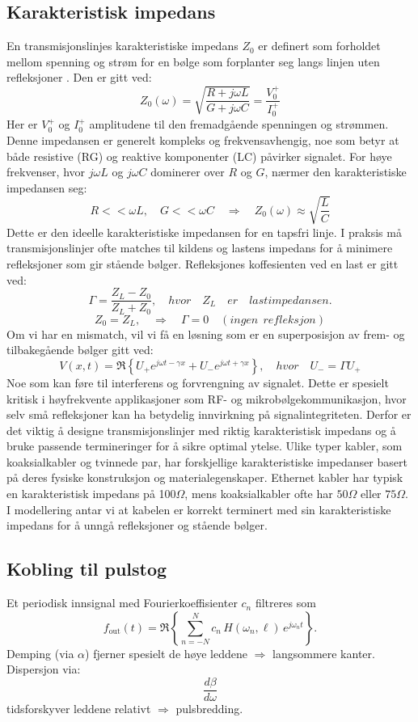 \subsection{Karakteristisk impedans}
En transmisjonslinjes karakteristiske impedans \(Z_0\) er definert som forholdet mellom spenning og strøm for en bølge som forplanter seg langs linjen uten refleksjoner \cite{HaytBuck2018}. Den er gitt ved:
\[
Z_0(\omega) = \sqrt{\frac{R + j\omega L}{G + j\omega C}} = \frac{V_0^+}{I_0^+} 
\]
Her er \(V_0^+\) og \(I_0^+\) amplitudene til den fremadgående spenningen og strømmen.
Denne impedansen er generelt kompleks og frekvensavhengig, noe som betyr at både resistive (RG) og reaktive komponenter (LC) påvirker signalet. For høye frekvenser, hvor \(j\omega L\) og \(j\omega C\) dominerer over \(R\) og \(G\), nærmer den karakteristiske impedansen seg:
\[
    R << \omega L, \quad G << \omega C \quad \Rightarrow \quad Z_0(\omega) \approx \sqrt{\frac{L}{C}}
\]
Dette er den ideelle karakteristiske impedansen for en tapsfri linje. I praksis må transmisjonslinjer ofte matches til kildens og lastens impedans for å minimere refleksjoner som gir stående bølger. Refleksjones koffesienten ved en last er gitt ved:
\[
    \Gamma = \frac{Z_L - Z_0}{Z_L + Z_0}, \quad hvor \quad Z_L \quad er \quad lastimpedansen.
\]
\[
    Z_0 = Z_L, \quad \Rightarrow \quad \Gamma = 0 \quad (ingen\ \ refleksjon)
\]
Om vi har en mismatch, vil vi få en løsning som er en superposisjon av frem- og tilbakegående bølger gitt ved:
\[
    V(x,t) = \Re\!\left\{ U_+ e^{j\omega t - \gamma x} + U_- e^{j\omega t + \gamma x} \right\}, \quad hvor \quad U_- = \Gamma U_+
\]
\clearpage
\noindent Noe som kan føre til interferens og forvrengning av signalet. Dette er spesielt kritisk i høyfrekvente applikasjoner som RF- og mikrobølgekommunikasjon, hvor selv små refleksjoner kan ha betydelig innvirkning på signalintegriteten. Derfor er det viktig å designe transmisjonslinjer med riktig karakteristisk impedans og å bruke passende termineringer for å sikre optimal ytelse.
Ulike typer kabler, som koaksialkabler og tvinnede par, har forskjellige karakteristiske impedanser basert på deres fysiske konstruksjon og materialegenskaper. Ethernet kabler har typisk en karakteristisk impedans på 100\(\Omega\), mens koaksialkabler ofte har $50\Omega$ eller $75\Omega$. I modellering antar vi at kabelen er korrekt terminert med sin karakteristiske impedans for å unngå refleksjoner og stående bølger.


\subsection{Kobling til pulstog}
Et periodisk innsignal med Fourierkoeffisienter \(c_n\) filtreres som
\[
f_{\text{out}}(t)=\Re\!\left\{\sum_{n=-N}^{N} c_n\,H(\omega_n,\ell)\,e^{j\omega_n t}\right\}.
\]
Demping (via \(\alpha\)) fjerner spesielt de høye leddene \(\Rightarrow\) langsommere kanter.\\
Dispersjon via: 
\[\frac{d\beta}{d\omega}\] 
tidsforskyver leddene relativt \(\Rightarrow\) pulsbredding.

